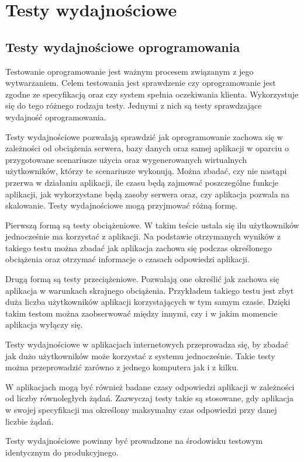 \chapter{Testy wydajnościowe}
\section{Testy wydajnościowe oprogramowania}
 Testowanie oprogramowanie jest ważnym procesem związanym z jego wytwarzaniem.  Celem testowania jest sprawdzenie czy oprogramowanie jest zgodne ze specyfikacją oraz czy system spełnia oczekiwania klienta. Wykorzystuje się do tego różnego rodzaju testy. Jednymi z nich są testy  sprawdzające wydajność oprogramowania. 

Testy wydajnościowe pozwalają sprawdzić jak oprogramowanie zachowa się w zależności od obciążenia serwera, bazy danych oraz samej aplikacji w oparciu o przygotowane scenariusze użycia oraz wygenerowanych wirtualnych użytkowników, którzy te scenariusze wykonują. Można zbadać, czy nie nastąpi przerwa w działaniu aplikacji, ile czasu będą zajmować poszczególne funkcje aplikacji, jak wykorzystane będą zasoby serwera oraz, czy aplikacja pozwala na skalowanie. Testy wydajnościowe mogą przyjmować różną formę. 

Pierwszą formą są testy obciążeniowe. W takim teście ustala się ilu użytkowników jednocześnie ma korzystać z aplikacji. Na podstawie otrzymanych wyników z takiego testu można zbadać jak aplikacja zachowa się podczas określonego obciążenia oraz otrzymać informacje o czasach odpowiedzi aplikacji.

Drugą formą są testy przeciążeniowe. Pozwalają one określić jak zachowa się aplikacja w warunkach skrajnego obciążenia. Przykładem takiego testu jest zbyt duża liczba użytkowników aplikacji korzystających w tym samym czasie. Dzięki takim testom można zaobserwować między innymi, czy i w jakim momencie aplikacja wyłączy się.

Testy wydajnościowe w aplikacjach internetowych  przeprowadza się, by zbadać jak dużo użytkowników może korzystać z systemu jednocześnie. Takie testy można przeprowadzić zarówno z jednego komputera jak i z kilku. 

W aplikacjach mogą być również badane czasy odpowiedzi aplikacji w zależności od liczby równoległych żądań. Zazwyczaj testy takie są stosowane, gdy aplikacja w swojej specyfikacji ma określony maksymalny czas odpowiedzi przy danej liczbie żądań.

Testy wydajnościowe powinny być prowadzone na środowisku testowym identycznym do produkcyjnego.


